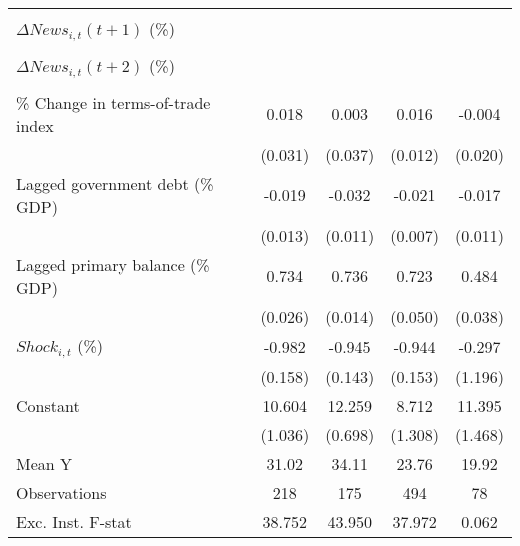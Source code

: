 {\begin{tabular}{l*{4}{c}}
                    &                     &                     &                     &                     \\
\addlinespace
$ \Delta News_{i,t}(t+1)$ (\%)&                     &                     &                     &                     \\
                    &                     &                     &                     &                     \\
\addlinespace
$ \Delta News_{i,t}(t+2)$ (\%)&                     &                     &                     &                     \\
                    &                     &                     &                     &                     \\
\addlinespace
\% Change in terms-of-trade index&       0.018         &       0.003         &       0.016         &      -0.004         \\
                    &     (0.031)         &     (0.037)         &     (0.012)         &     (0.020)         \\
\addlinespace
Lagged government debt (\% GDP)&      -0.019         &      -0.032\sym{**} &      -0.021\sym{***}&      -0.017         \\
                    &     (0.013)         &     (0.011)         &     (0.007)         &     (0.011)         \\
\addlinespace
Lagged primary balance (\% GDP)&       0.734\sym{***}&       0.736\sym{***}&       0.723\sym{***}&       0.484\sym{***}\\
                    &     (0.026)         &     (0.014)         &     (0.050)         &     (0.038)         \\
\addlinespace
$ Shock_{i,t}$ (\%) &      -0.982\sym{***}&      -0.945\sym{***}&      -0.944\sym{***}&      -0.297         \\
                    &     (0.158)         &     (0.143)         &     (0.153)         &     (1.196)         \\
\addlinespace
Constant            &      10.604\sym{***}&      12.259\sym{***}&       8.712\sym{***}&      11.395\sym{***}\\
                    &     (1.036)         &     (0.698)         &     (1.308)         &     (1.468)         \\
\midrule
Mean Y              &       31.02         &       34.11         &       23.76         &       19.92         \\
Observations        &         218         &         175         &         494         &          78         \\
Exc. Inst. F-stat   &      38.752         &      43.950         &      37.972         &       0.062         \\
\bottomrule
\end{tabular}
}
